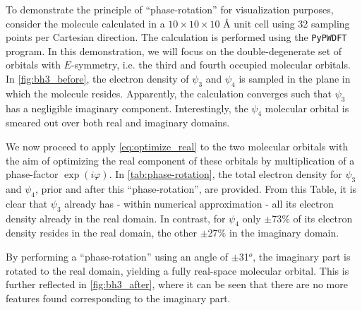 To demonstrate the principle of ``phase-rotation'' for visualization purposes, consider the  molecule calculated in a $10 \times 10 \times 10$ \AA\; unit cell using 32 sampling points per Cartesian direction. The calculation is performed using the \texttt{PyPWDFT}\cite{pypwdft} program. In this demonstration, we will focus on the double-degenerate set of orbitals with $E$-symmetry, i.e. the third and fourth occupied molecular orbitals. In \cref{fig:bh3_before}, the electron density of $\psi_{3}$ and $\psi_{4}$ is sampled in the plane in which the  molecule resides. Apparently, the calculation converges such that $\psi_{3}$ has a negligible imaginary component. Interestingly, the $\psi_{4}$ molecular orbital is smeared out over both real and imaginary domains. 

We now proceed to apply \cref{eq:optimize_real} to the two molecular orbitals with the aim of optimizing the real component of these orbitals by multiplication of a phase-factor $\exp \left(i \varphi \right)$. In \cref{tab:phase-rotation}, the total electron density for $\psi_{3}$ and $\psi_{4}$, prior and after this ``phase-rotation'', are provided. From this Table, it is clear that $\psi_{3}$ already has - within numerical approximation - all its electron density already in the real domain. In contrast, for $\psi_{4}$ only $\pm$73\% of its electron density resides in the real domain, the other $\pm$27\% in the imaginary domain.

By performing a ``phase-rotation'' using an angle of $\pm$31$^{o}$, the imaginary part is rotated to the real domain, yielding a fully real-space molecular orbital. This is further reflected in \cref{fig:bh3_after}, where it can be seen that there are no more features found corresponding to the imaginary part.

